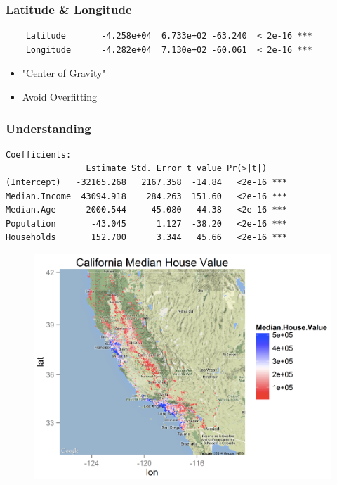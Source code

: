 \documentclass{beamer}
\begin{document}
\begin{frame}[fragile]
    \frametitle{Latitude \& Longitude}
\begin{verbatim}
	Latitude       -4.258e+04  6.733e+02 -63.240  < 2e-16 ***
	Longitude      -4.282e+04  7.130e+02 -60.061  < 2e-16 ***
\end{verbatim}
\begin{itemize}
\item "Center of Gravity"
\item Avoid Overfitting
\end{itemize}
	
\end{frame}

\begin{frame}[fragile]
    \frametitle{Understanding}
	\begin{verbatim}
Coefficients:
                Estimate Std. Error t value Pr(>|t|)    
(Intercept)   -32165.268   2167.358  -14.84   <2e-16 ***
Median.Income  43094.918    284.263  151.60   <2e-16 ***
Median.Age      2000.544     45.080   44.38   <2e-16 ***
Population       -43.045      1.127  -38.20   <2e-16 ***
Households       152.700      3.344   45.66   <2e-16 ***
\end{verbatim}
\end{frame}

\begin{frame}
	\begin{figure}
 \includegraphics[scale=0.3]{figures/california.png}
\end{figure}
\end{frame}
\end{document}
